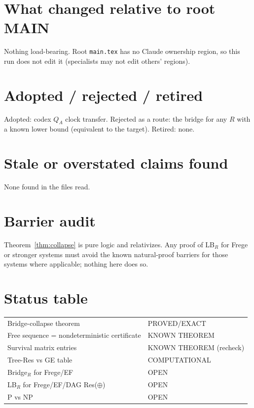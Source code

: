 \documentclass[11pt]{article}
\begin{document}
\section*{What changed relative to root MAIN}
Nothing load-bearing. Root \texttt{main.tex} has no Claude ownership region,
so this run does not edit it (specialists may not edit others' regions).

\section*{Adopted / rejected / retired}
Adopted: codex $Q_A$ clock transfer. Rejected as a route: the bridge for any
$R$ with a known lower bound (equivalent to the target). Retired: none.

\section*{Stale or overstated claims found}
None found in the files read.

\section*{Barrier audit}
Theorem~\ref{thm:collapse} is pure logic and relativizes. Any proof of
LB$_R$ for Frege or stronger systems must avoid the known natural-proof
barriers for those systems where applicable; nothing here does so.

\section*{Status table}
\begin{tabular}{ll}
\toprule
Bridge-collapse theorem & PROVED/EXACT\\
Free sequence = nondeterministic certificate & KNOWN THEOREM\\
Survival matrix entries & KNOWN THEOREM (recheck)\\
Tree-Res vs GE table & COMPUTATIONAL\\
Bridge$_R$ for Frege/EF & OPEN\\
LB$_R$ for Frege/EF/DAG Res($\oplus$) & OPEN\\
P vs NP & OPEN\\
\bottomrule
\end{tabular}
\end{document}
